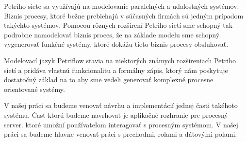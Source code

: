 Petriho siete sa využívajú na modelovanie paralelných a udalostných systémov. Biznis procesy, ktoré bežne prebiehajú v súčasných firmách sú jedným prípadom takýchto systémov. Pomocou rôznych rozšírení Petriho sietí sme schopný tak podrobne namodelovať biznis proces, že na základe modelu sme schopný vygenerovať funkčné systémy, ktoré dokážu tieto biznis procesy obsluhovať.  

Modelovací jazyk Petriflow stavia na niektorých známych rozšíreniach Petriho sietí a pridáva vlastnú funkcionalitu a formálny zápis, ktorý nám poskytuje dostatočný základ na to aby sme vedeli generovať komplexné procesne orientované systémy. 

V našej práci sa budeme venovať návrhu a implementácií jednej časti takéhoto systému. Časť ktorú budeme navrhovať je aplikačné rozhranie pre procesný server. ktoré umožní používateľom interagovať s procesným systémom. V našej práci sa budeme hlavne venovať práci s prechodmi, rolami a  dátovými poľami. 